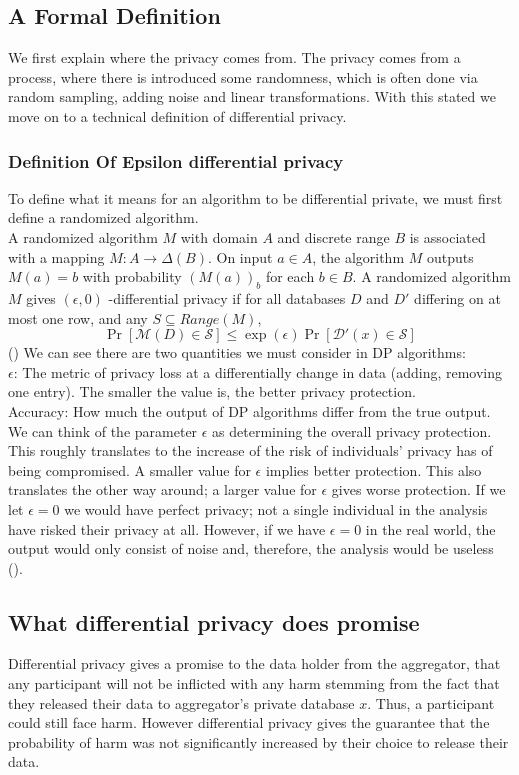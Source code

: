 \documentclass[11pt]{article}
\theoremstyle{definition}
\begin{document}
\subsection{A Formal Definition}\label{form}
We first explain where the privacy comes from. The privacy comes from a process, where there is introduced some randomness, which is often done via random sampling, adding noise and linear transformations. With this stated we move on to a technical definition of differential privacy.
\subsubsection{Definition Of Epsilon differential privacy}
To define what it means for an algorithm to be differential private, we must first define a randomized algorithm.\\ A randomized algorithm $M$ with domain $A$ and discrete range $B$ is associated with a mapping $M:A\rightarrow\Delta(B)$. On input $a\in A$, the algorithm $M$ outputs $M(a) =b$ with probability $(M(a))_b$ for each $b\in B$.
A randomized algorithm $M$ gives $(\epsilon,0)$ -differential privacy if for all databases $D$ and $D'$ differing on at most one row, and any $S \subseteq Range(M)$,
\[
\operatorname{Pr}[\mathcal{M}(D) \in \mathcal{S}] \leq \exp (\epsilon) \operatorname{Pr}[\mathcal{D'}(x) \in \mathcal{S}]
\] (\cite[17]{algo_fun})
We can see there are two quantities we must consider in DP algorithms: \\ $\epsilon$: The metric of privacy loss at a differentially change in data (adding, removing one entry). The smaller the value is, the better privacy protection. \\ Accuracy: How much the output of DP algorithms differ from the true output.
We can think of the parameter $\epsilon$ as determining the overall privacy protection. This roughly translates to the increase of the risk of individuals' privacy has of being compromised. A smaller value for $\epsilon$ implies better protection. This also translates the other way around; a larger value for $\epsilon$ gives worse protection. If we let $\epsilon = 0$ we would have perfect privacy; not a single individual in the analysis have risked their privacy at all. However, if we have $\epsilon = 0$ in the real world, the output would only consist of noise and, therefore, the analysis would be useless (\cite[23]{havard}).

\subsection{What differential privacy does promise}
Differential privacy gives a promise to the data holder from the aggregator, that any participant will not be inflicted with any harm stemming from the fact that they released their data to aggregator's private database $x$. Thus, a participant could still face harm. However differential privacy gives the guarantee that the probability of harm was not significantly increased by their choice to release their data. 
\end{document}

